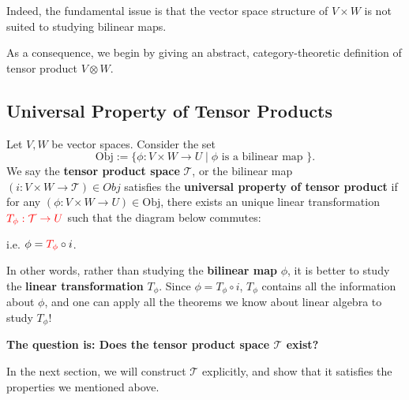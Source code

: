 Indeed, the fundamental issue is that the vector space structure of \( V \times W \) is not suited to studying bilinear maps.

\medskip

As a consequence, we begin by giving an abstract, category-theoretic definition of tensor product \( V \otimes W \).

\subsection{Universal Property of Tensor Products}
\begin{definition}\label{def:univtensor}
Let \(V,W\) be vector spaces. Consider the set
\[
\text{Obj} :=  \{ \phi  : V \times  W \rightarrow  U \mid  \phi \text{ is a bilinear map }\}.
\]
We say the {\bf tensor product space} \(\mathcal{T}\), or the bilinear map \(\left( {i : V \times  W \rightarrow  \mathcal{T}}\right)  \in Obj\) satisfies the {\bf universal property of tensor product} if for any \((\phi  : V \times  W \rightarrow U) \in  \mathrm{{Obj}}\), there exists an unique linear transformation \(\color{red} T_{\phi } : \mathcal{T} \rightarrow  U\) such that the diagram below commutes:


\begin{center}
 \quad \quad \quad i.e. \(\phi  = {\color{red} T_{\phi}} \circ  i\).
\end{center} 

\end{definition}

\noindent
In other words, rather than studying the \textbf{bilinear map} \( \phi \), it is better to study the \textbf{linear transformation} \( T_\phi \). Since \( \phi = T_\phi \circ i \), \( T_\phi \) contains all the information about \( \phi \), and one can apply all the theorems we know about linear algebra to study \( T_\phi \)!

\bigskip

\noindent
\textbf{\Large The question is: Does the tensor product space \( \mathcal{T} \) exist?}

\bigskip

\noindent
In the next section, we will construct \( \mathcal{T} \) explicitly, and show that it satisfies the properties we mentioned above.


